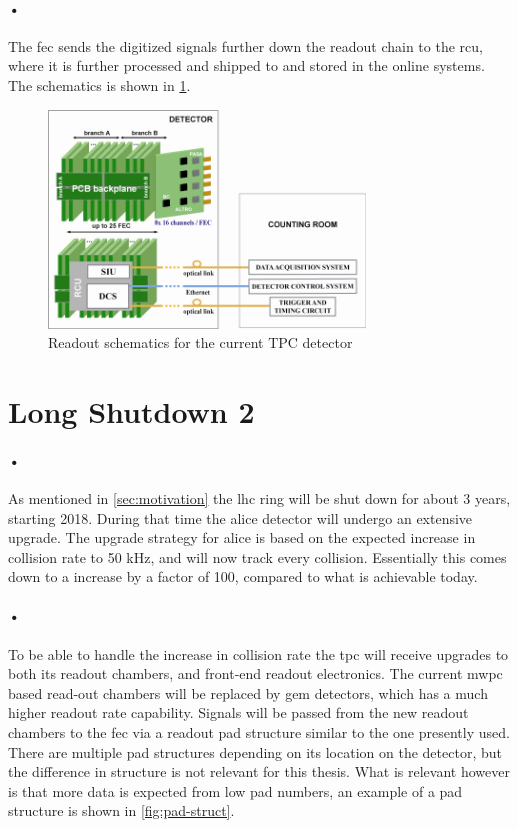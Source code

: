 \documentclass[a4paper, 12pt]{report}
\begin{document}
\paragraph{•}
The \gls{fec} sends the digitized signals further down the readout chain to the \gls{rcu}, where it is further processed and shipped to  and stored in the online systems.
The schematics is shown in \ref{fig:altro}.

\begin{figure}[h!]
  \centering
    \includegraphics[width=0.75\textwidth]{images/altro.png}
     \caption[Readout schematics for the current TPC detector]{Readout schematics for the current TPC detector \cite{tdr-016}}
    \label{fig:altro}
\end{figure}

\section{Long Shutdown 2}
\paragraph{•}
As mentioned in \ref{sec:motivation} the \gls{lhc} ring will be shut down for about 3 years, starting 2018.
During that time the \gls{alice} detector will undergo an extensive upgrade.
The upgrade strategy for \gls{alice} is based on the expected increase in collision rate to 50 kHz, and will now track every collision.
Essentially this comes down to a increase by a factor of 100, compared to what is achievable today.

\paragraph{•} 
To be able to handle the increase in collision rate the \gls{tpc} will receive upgrades to both its readout chambers, and front-end readout electronics.
The current \gls{mwpc} based read-out chambers will be replaced by \gls{gem} detectors, which has a much higher readout rate capability.
Signals will be passed from the new readout chambers to the \gls{fec} via a readout pad structure similar to the one presently used.
There are multiple pad structures depending on its location on the detector, but the difference in structure is not relevant for this thesis.
What is relevant however is that more data is expected from low pad numbers, an example of a pad structure is shown in \ref{fig:pad-struct}.
\end{document}
